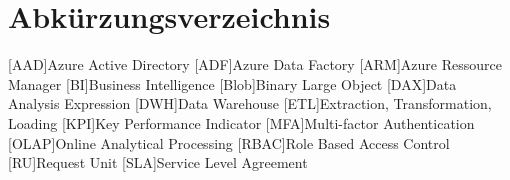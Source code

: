 \renewcommand{\chaptermark}[1]{\markboth{\spacedlowsmallcaps{#1}}{\spacedlowsmallcaps{#1}}}
\renewcommand{\sectionmark}[1]{\markright{\thesection\enspace\spacedlowsmallcaps{#1}}}
\chapter*{Abk\"{u}rzungsverzeichnis}

\begin{acronym}[RBAC]
    [AAD]{Azure Active Directory}
    [ADF]{Azure Data Factory}
    [ARM]{Azure Ressource Manager}
    [BI]{Business Intelligence}
    [Blob]{Binary Large Object}
    [DAX]{Data Analysis Expression}
    [DWH]{Data Warehouse}
    [ETL]{Extraction, Transformation, Loading}
    [KPI]{Key Performance Indicator}
    [MFA]{Multi-factor Authentication}
    [OLAP]{Online Analytical Processing}
    [RBAC]{Role Based Access Control}
    [RU]{Request Unit}
    [SLA]{Service Level Agreement}
\end{acronym}

\cleardoublepage
